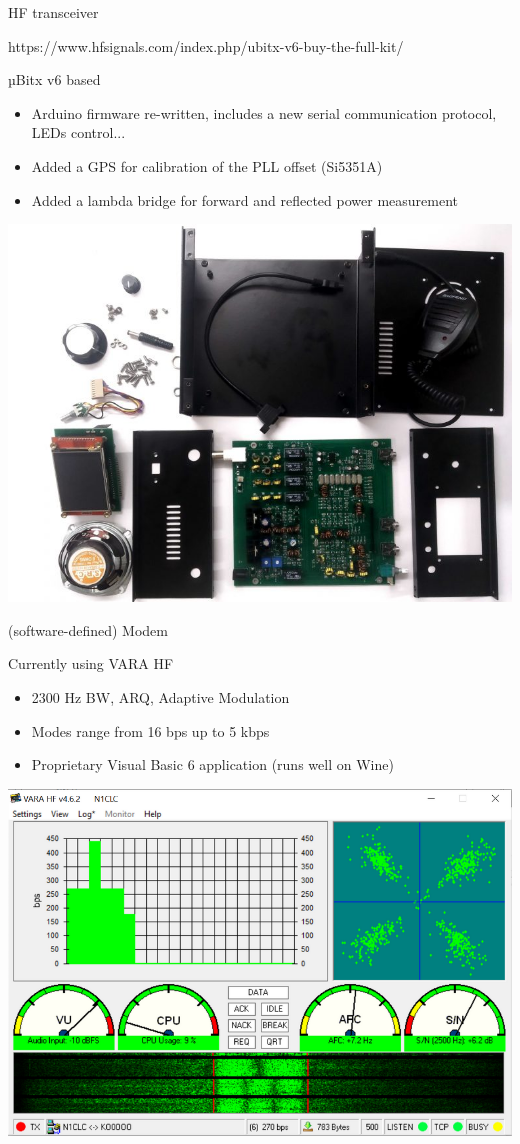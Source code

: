 \documentclass[aspectratio=169,xcolor={x11names,svgnames,dvipsnames}]{beamer}
\begin{document}
\begin{frame}{HF transceiver}

  \begin{center}
https://www.hfsignals.com/index.php/ubitx-v6-buy-the-full-kit/
  \end{center}

\begin{block}{µBitx v6 based}
    \begin{itemize}
    \item Arduino firmware re-written, includes a new serial communication protocol, LEDs control...
    \item Added a GPS for calibration of the PLL offset (Si5351A)
    \item Added a lambda bridge for forward and reflected power measurement
    \end{itemize}
  \end{block}

\begin{center}
  \vspace{-0.5cm}\includegraphics[width=.35\columnwidth]{ubitx.jpg}
\end{center}

\end{frame}


\begin{frame}{(software-defined) Modem}

\begin{block}{Currently using VARA HF}
    \begin{itemize}
    \item 2300 Hz BW, ARQ, Adaptive Modulation
    \item Modes range from 16 bps up to 5 kbps
    \item Proprietary Visual Basic 6 application (runs well on Wine)
    \end{itemize}
  \end{block}

\begin{center}
  \vspace{-0.15cm}\includegraphics[width=.42\columnwidth]{vara.png}
\end{center}

\end{frame}
\end{document}
